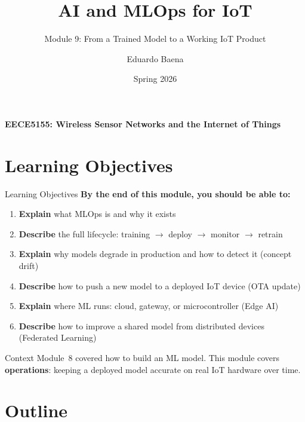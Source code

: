 \documentclass[aspectratio=169,11pt]{beamer}
\title[EECE5155 -- Module 9]{AI and MLOps for IoT}
\subtitle{Module 9: From a Trained Model to a Working IoT Product}
\author{Eduardo Baena}
\date{Spring 2026}
\institute{Northeastern University\\Department of Electrical and Computer Engineering\\
\texttt{e.baena@northeastern.edu}}
\begin{document}
\begin{frame}
    \titlepage
    \vspace{-1cm}
    \begin{center}
        \textbf{EECE5155: Wireless Sensor Networks and the Internet of Things}
    \end{center}
\end{frame}

\section{Learning Objectives}

\begin{frame}{Learning Objectives}
    \textbf{By the end of this module, you should be able to:}

    \vspace{0.2cm}
    \begin{enumerate}
        \item \textbf{Explain} what MLOps is and why it exists
        \item \textbf{Describe} the full lifecycle: training $\rightarrow$ deploy $\rightarrow$ monitor $\rightarrow$ retrain
        \item \textbf{Explain} why models degrade in production and how to detect it (concept drift)
        \item \textbf{Describe} how to push a new model to a deployed IoT device (OTA update)
        \item \textbf{Explain} where ML runs: cloud, gateway, or microcontroller (Edge AI)
        \item \textbf{Describe} how to improve a shared model from distributed devices (Federated Learning)
    \end{enumerate}

    \vspace{0.1cm}
    \begin{exampleblock}{Context}
        Module~8 covered how to build an ML model. This module covers \textbf{operations}: keeping a deployed model accurate on real IoT hardware over time.
    \end{exampleblock}
\end{frame}

\section{Outline}
\end{document}
